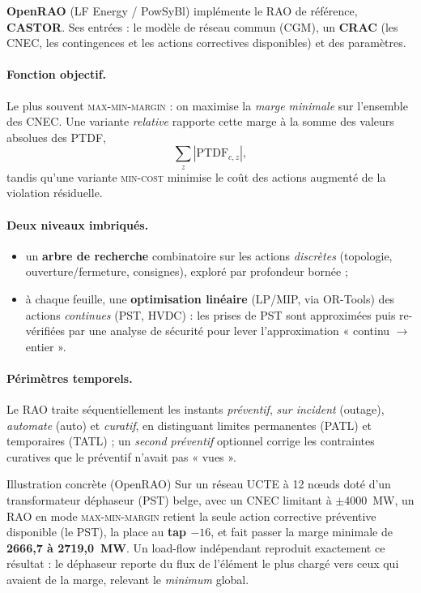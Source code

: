 \documentclass[11pt,a4paper]{article}
\newcommand{\PTDF}{\mathrm{PTDF}}
\begin{document}
\textbf{OpenRAO} (LF Energy / PowSyBl) implémente le RAO de référence,
\textbf{CASTOR}. Ses entrées : le modèle de réseau commun (CGM), un
\textbf{CRAC} (les CNEC, les contingences et les actions correctives
disponibles) et des paramètres.

\paragraph{Fonction objectif.} Le plus souvent \textsc{max-min-margin} :
on maximise la \emph{marge minimale} sur l'ensemble des CNEC. Une variante
\emph{relative} rapporte cette marge à la somme des valeurs absolues des
PTDF,
\[
  \textstyle\sum_z |\PTDF_{c,z}| ,
\]
tandis qu'une variante \textsc{min-cost} minimise le coût des actions
augmenté de la violation résiduelle.

\paragraph{Deux niveaux imbriqués.}
\begin{itemize}[nosep,leftmargin=1.4em]
  \item un \textbf{arbre de recherche} combinatoire sur les actions
        \emph{discrètes} (topologie, ouverture/fermeture, consignes),
        exploré par profondeur bornée ;
  \item à chaque feuille, une \textbf{optimisation linéaire} (LP/MIP, via
        OR-Tools) des actions \emph{continues} (PST, HVDC) : les prises de
        PST sont approximées puis re-vérifiées par une analyse de sécurité
        pour lever l'approximation « continu $\to$ entier ».
\end{itemize}

\paragraph{Périmètres temporels.} Le RAO traite séquentiellement les
instants \emph{préventif}, \emph{sur incident} (outage), \emph{automate}
(auto) et \emph{curatif}, en distinguant limites permanentes (PATL) et
temporaires (TATL) ; un \emph{second préventif} optionnel corrige les
contraintes curatives que le préventif n'avait pas « vues ».

\begin{rembox}{Illustration concrète (OpenRAO)}
Sur un réseau UCTE à 12 n\oe{}uds doté d'un transformateur déphaseur (PST)
belge, avec un CNEC limitant à $\pm4000$~MW, un RAO en mode
\textsc{max-min-margin} retient la seule action corrective préventive
disponible (le PST), la place au \textbf{tap $-16$}, et fait passer la marge
minimale de \textbf{2666{,}7 à 2719{,}0~MW}. Un load-flow indépendant
reproduit exactement ce résultat : le déphaseur reporte du flux de l'élément
le plus chargé vers ceux qui avaient de la marge, relevant le \emph{minimum}
global.
\end{rembox}
\end{document}
